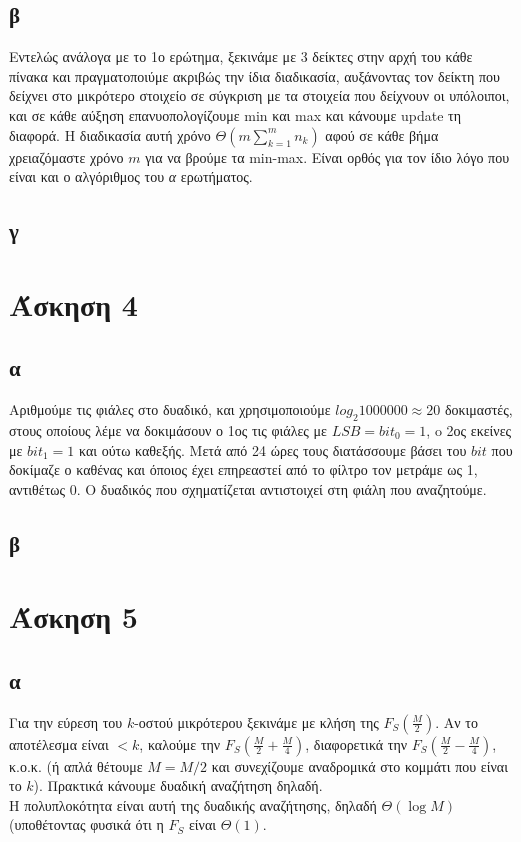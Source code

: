 \documentclass[12pt,a4paper]{article}
\begin{document}
  \subsection{β}
    Εντελώς ανάλογα με το 1ο ερώτημα, ξεκινάμε με 3 δείκτες στην αρχή του κάθε
    πίνακα και πραγματοποιύμε ακριβώς την ίδια διαδικασία, αυξάνοντας τον
    δείκτη που δείχνει στο μικρότερο στοιχείο σε σύγκριση με τα στοιχεία που
    δείχνουν οι υπόλοιποι, και σε κάθε αύξηση επανυοπολογίζουμε {\latintext
    min} και {\latintext max} και κάνουμε {\latintext update} τη διαφορά. 
    Η διαδικασία αυτή χρόνο \(\Theta(m\sum_{k=1}^{m}n_k)\) αφού σε κάθε βήμα 
    χρειαζόμαστε χρόνο \(m\) για να βρούμε τα {\latintext min-max}. Είναι 
    ορθός για τον ίδιο λόγο που είναι και ο αλγόριθμος του \textit{α} ερωτήματος.
  
  \subsection{γ}

  \section{Άσκηση 4}

  \subsection{α}
    Αριθμούμε τις φιάλες στο δυαδικό, και χρησιμοποιούμε \(log_{2}{1000000}
    \approx 20 \) δοκιμαστές, στους οποίους λέμε να δοκιμάσουν ο 1ος τις φιάλες
    με \(LSB=bit_{0}=1\), o 2ος εκείνες με \(bit_{1}=1\) και ούτω καθεξής.
    Μετά από 24 ώρες τους διατάσσουμε βάσει του \(bit\) που δοκίμαζε ο καθένας
    και όποιος έχει επηρεαστεί από το φίλτρο τον μετράμε ως 1, αντιθέτως 0.
    Ο δυαδικός που σχηματίζεται αντιστοιχεί στη φιάλη που αναζητούμε.
  
  \subsection{β}

  \section{Άσκηση 5}

  \subsection{α}
    Για την εύρεση του \( k \)-οστού μικρότερου ξεκινάμε με κλήση της 
    \( F_S{(\frac{M}{2})} \). Αν το αποτέλεσμα είναι \( <k \), καλούμε
    την \( F_S{(\frac{M}{2} + \frac{M}{4})} \), διαφορετικά την
    \( F_S{(\frac{M}{2} - \frac{M}{4})} \), κ.ο.κ. (ή απλά θέτουμε
    \( M=M/2 \) και συνεχίζουμε αναδρομικά στο κομμάτι που είναι το \( k \)).
    Πρακτικά κάνουμε δυαδική αναζήτηση δηλαδή.\\
    Η πολυπλοκότητα είναι αυτή της δυαδικής αναζήτησης, δηλαδή
    \( \Theta(\log{M}) \) (υποθέτοντας φυσικά ότι η \( F_S \) είναι 
    \( \Theta(1) \).
  
\end{document}
